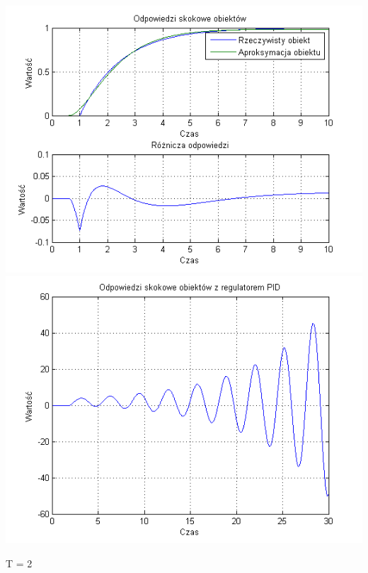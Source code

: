 \documentclass[10pt,a4paper]{article}
\begin{document}
\begin{center}
\includegraphics[scale=1]{images/dwa/skrypt_19.png}\\
\includegraphics[scale=1]{images/dwa/skrypt_20.png}\\
\end{center}
\newpage
T = 2
\end{document}
